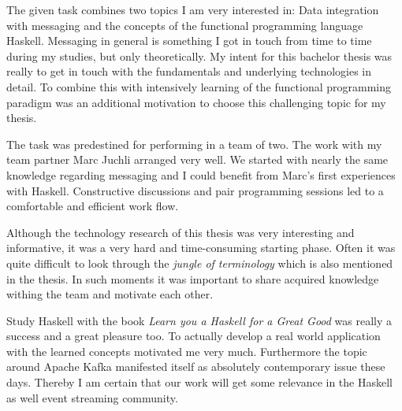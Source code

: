 The given task combines two topics I am very interested in: Data integration
with messaging and the concepts of the functional programming language Haskell.
Messaging in general is something I got in touch from time to time during my
studies, but only theoretically. My intent for this bachelor thesis was really to
get in touch with the fundamentals and underlying technologies in detail. To
combine this with intensively learning of the functional programming paradigm was an
additional motivation to choose this challenging topic for my thesis.

The task was predestined for performing in a team of two. The work with my team
partner Marc Juchli arranged very well. We started with nearly the same
knowledge regarding messaging and I could benefit from Marc's first experiences
with Haskell. Constructive discussions and pair programming sessions led to a
comfortable and efficient work flow.

Although the technology research of this thesis was very interesting and
informative, it was a very hard and time-consuming starting phase. Often it was
quite difficult to look through the \textit{jungle of terminology} which is also
mentioned in the thesis. In such moments it was important to share acquired
knowledge withing the team and motivate each other.

Study Haskell with the book \textit{Learn you a Haskell for a Great Good} was
really a success and a great pleasure too. To actually develop a real world
application with the learned concepts motivated me very much. Furthermore
the topic around Apache Kafka manifested itself as absolutely contemporary issue
these days. Thereby I am certain that our work will get some relevance in
the Haskell as well event streaming community.



